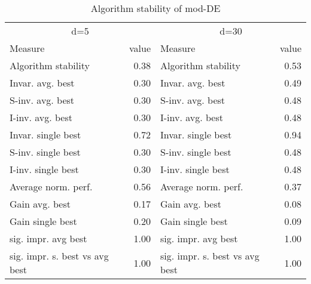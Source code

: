 \begin{table}
\caption{Algorithm stability of mod-DE}
\begin{tabular}{lrlr}
\toprule
\multicolumn{2}{c}{d=5} & \multicolumn{2}{c}{d=30} \\
Measure & value & Measure & value \\
\midrule
Algorithm stability & 0.38 & Algorithm stability & 0.53 \\
Invar. avg. best & 0.30 & Invar. avg. best & 0.49 \\
S-inv. avg. best & 0.30 & S-inv. avg. best & 0.48 \\
I-inv. avg. best & 0.30 & I-inv. avg. best & 0.48 \\
Invar. single best & 0.72 & Invar. single best & 0.94 \\
S-inv. single best & 0.30 & S-inv. single best & 0.48 \\
I-inv. single best & 0.30 & I-inv. single best & 0.48 \\
Average norm. perf. & 0.56 & Average norm. perf. & 0.37 \\
Gain avg. best & 0.17 & Gain avg. best & 0.08 \\
Gain single best & 0.20 & Gain single best & 0.09 \\
sig. impr. avg best & 1.00 & sig. impr. avg best & 1.00 \\
sig. impr. s. best vs avg best & 1.00 & sig. impr. s. best vs avg best & 1.00 \\
\bottomrule
\end{tabular}
\end{table}
